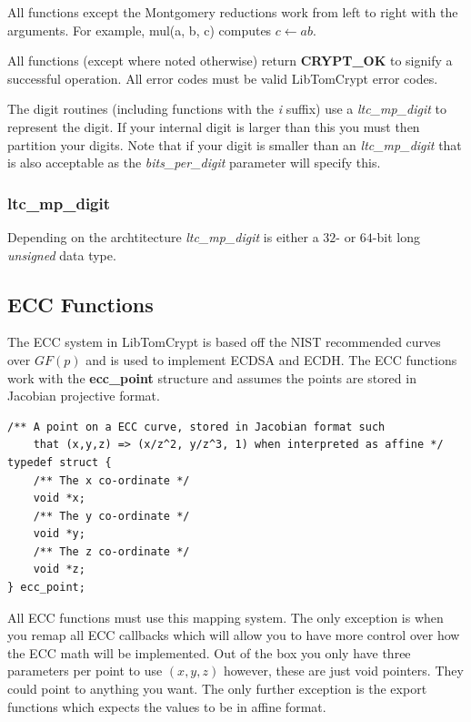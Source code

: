 \documentclass[synpaper]{book}
\begin{document}
All functions except the Montgomery reductions work from left to right with the arguments.  For example, mul(a, b, c) computes $c \leftarrow ab$.

All functions (except where noted otherwise) return \textbf{CRYPT\_OK} to signify a successful operation.  All error codes must be valid LibTomCrypt error codes.

The digit routines (including functions with the \textit{i} suffix) use a \textit{ltc\_mp\_digit} to represent the digit.  If your internal digit is larger than this you must
then partition your digits.  Note that if your digit is smaller than an \textit{ltc\_mp\_digit} that is also acceptable as the \textit{bits\_per\_digit} parameter will specify this.

\subsubsection{ltc\_mp\_digit}

Depending on the archtitecture \textit{ltc\_mp\_digit} is either a $32$- or $64$-bit long \textit{unsigned} data type.

\subsection{ECC Functions}
The ECC system in LibTomCrypt is based off the NIST recommended curves over $GF(p)$ and is used to implement ECDSA and ECDH.   The ECC functions work with
the \textbf{ecc\_point} structure and assumes the points are stored in Jacobian projective format.

\begin{verbatim}
/** A point on a ECC curve, stored in Jacobian format such
    that (x,y,z) => (x/z^2, y/z^3, 1) when interpreted as affine */
typedef struct {
    /** The x co-ordinate */
    void *x;
    /** The y co-ordinate */
    void *y;
    /** The z co-ordinate */
    void *z;
} ecc_point;
\end{verbatim}

All ECC functions must use this mapping system.  The only exception is when you remap all ECC callbacks which will allow you to have more control
over how the ECC math will be implemented.  Out of the box you only have three parameters per point to use $(x, y, z)$ however, these are just void pointers.
They could point to anything you want.  The only further exception is the export functions which expects the values to be in affine format.
\end{document}
